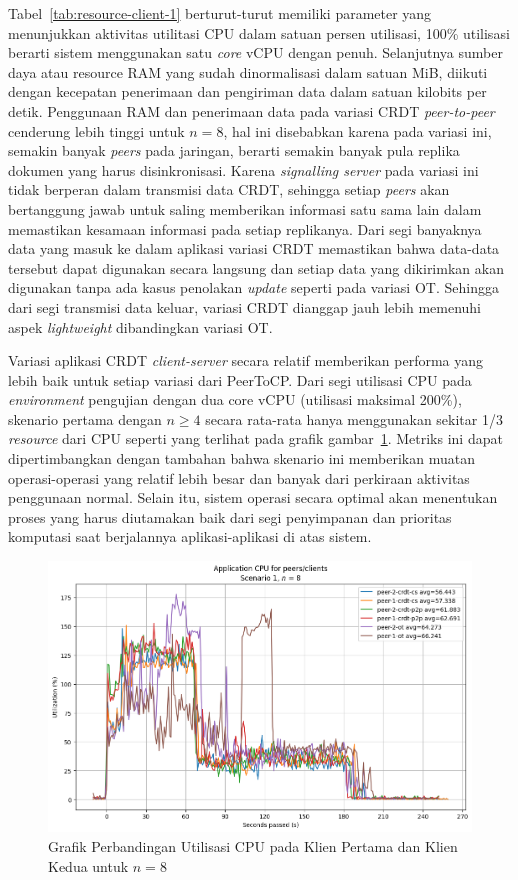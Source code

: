 Tabel~\ref{tab:resource-client-1} berturut-turut memiliki parameter yang menunjukkan aktivitas utilitasi CPU dalam satuan persen utilisasi, 100\% utilisasi berarti sistem menggunakan satu \textit{core} vCPU dengan penuh. Selanjutnya sumber daya atau resource RAM yang sudah dinormalisasi dalam satuan MiB, diikuti dengan kecepatan penerimaan dan pengiriman data dalam satuan kilobits per detik. Penggunaan RAM dan penerimaan data pada variasi CRDT \textit{peer-to-peer} cenderung lebih tinggi untuk $n = 8$, hal ini disebabkan karena pada variasi ini, semakin banyak \textit{peers} pada jaringan, berarti semakin banyak pula replika dokumen yang harus disinkronisasi. Karena \textit{signalling server} pada variasi ini tidak berperan dalam transmisi data CRDT, sehingga setiap \textit{peers} akan bertanggung jawab untuk saling memberikan informasi satu sama lain dalam memastikan kesamaan informasi pada setiap replikanya. Dari segi banyaknya data yang masuk ke dalam aplikasi variasi CRDT memastikan bahwa data-data tersebut dapat digunakan secara langsung dan setiap data yang dikirimkan akan digunakan tanpa ada kasus penolakan \textit{update} seperti pada variasi OT. Sehingga dari segi transmisi data keluar, variasi CRDT dianggap jauh lebih memenuhi aspek \textit{lightweight} dibandingkan variasi OT.

Variasi aplikasi CRDT \textit{client-server} secara relatif memberikan performa yang lebih baik untuk setiap variasi dari PeerToCP. Dari segi utilisasi CPU pada \textit{environment} pengujian dengan dua core vCPU (utilisasi maksimal 200\%), skenario pertama dengan $n \geq 4$ secara rata-rata hanya menggunakan sekitar 1/3 \textit{resource} dari CPU seperti yang terlihat pada grafik gambar~\ref{fig:2-19}. Metriks ini dapat dipertimbangkan dengan tambahan bahwa skenario ini memberikan muatan operasi-operasi yang relatif lebih besar dan banyak dari perkiraan aktivitas penggunaan normal. Selain itu, sistem operasi secara optimal akan menentukan proses yang harus diutamakan baik dari segi penyimpanan dan prioritas komputasi saat berjalannya aplikasi-aplikasi di atas sistem.

\begin{figure}
 \centering
 \includegraphics[width=13cm]{./assets/skripsi/benchmark-vis_cell_2_output_19}
 \caption{Grafik Perbandingan Utilisasi CPU pada Klien Pertama dan Klien Kedua untuk $n = 8$}
 \label{fig:2-19}
\end{figure}

